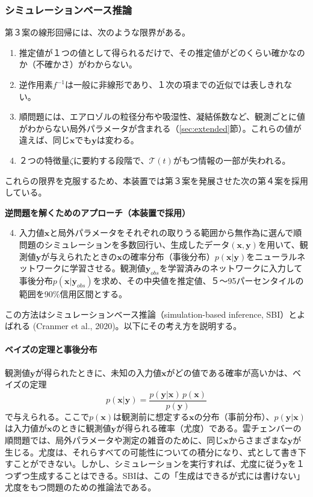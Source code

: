 \documentclass{ltjsarticle}
\begin{document}
\subsubsection{シミュレーションベース推論}\label{sec:sbi}
第３案の線形回帰には、次のような限界がある。
\begin{enumerate}
\item 推定値が１つの値として得られるだけで、その推定値がどのくらい確かなのか（不確かさ）がわからない。
\item 逆作用素$f^{-1}$は一般に非線形であり、１次の項までの近似では表しきれない。
\item 順問題には、エアロゾルの粒径分布や吸湿性、凝結係数など、観測ごとに値がわからない局外パラメータが含まれる（\ref{sec:extended}節）。これらの値が違えば、同じ$\bm{x}$でも$\bm{y}$は変わる。
\item ２つの特徴量$\zeta$に要約する段階で、$\mathcal{T}(t)$がもつ情報の一部が失われる。
\end{enumerate}
これらの限界を克服するため、本装置では第３案を発展させた次の第４案を採用している。
\begin{itembox}[l]{\bf{逆問題を解くためのアプローチ（本装置で採用）}}
\begin{enumerate}
\setcounter{enumi}{3}
\item 入力値$\bm{x}$と局外パラメータをそれぞれの取りうる範囲から無作為に選んで順問題のシミュレーションを多数回行い、生成したデータ$(\bm{x}, \bm{y})$を用いて、観測値$\bm{y}$が与えられたときの$\bm{x}$の確率分布（事後分布）$p(\bm{x}|\bm{y})$をニューラルネットワークに学習させる。観測値$\bm{y}_{obs}$を学習済みのネットワークに入力して事後分布$p(\bm{x}|\bm{y}_{obs})$を求め、その中央値を推定値、５〜95パーセンタイルの範囲を90\%信用区間とする。
\end{enumerate}
\end{itembox}
この方法はシミュレーションベース推論（simulation-based inference, SBI）とよばれる (Cranmer et al., 2020)。以下にその考え方を説明する。

\paragraph{ベイズの定理と事後分布}
観測値$\bm{y}$が得られたときに、未知の入力値$\bm{x}$がどの値である確率が高いかは、ベイズの定理
\begin{equation}\label{eq:bayes}
p(\bm{x}|\bm{y}) = \frac{p(\bm{y}|\bm{x})\,p(\bm{x})}{p(\bm{y})}
\end{equation}
で与えられる。ここで$p(\bm{x})$は観測前に想定する$\bm{x}$の分布（事前分布）、$p(\bm{y}|\bm{x})$は入力値が$\bm{x}$のときに観測値$\bm{y}$が得られる確率（尤度）である。雲チェンバーの順問題では、局外パラメータや測定の雑音のために、同じ$\bm{x}$からさまざまな$\bm{y}$が生じる。尤度は、それらすべての可能性についての積分になり、式として書き下すことができない。しかし、シミュレーションを実行すれば、尤度に従う$\bm{y}$を１つずつ生成することはできる。SBIは、この「生成はできるが式には書けない」尤度をもつ問題のための推論法である。
\end{document}
